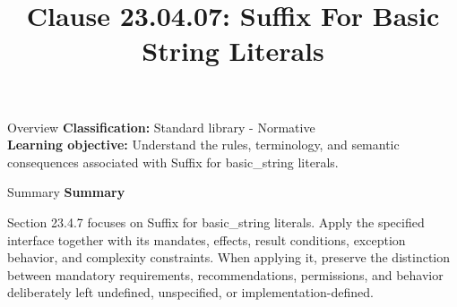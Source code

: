 \documentclass[10pt,letterpaper]{article}
\title{Clause 23.04.07: Suffix For Basic String Literals}
\author{}
\date{}
\begin{document}
\maketitle
\begin{CornellOverviewBox}{Overview}
\textbf{Classification:} Standard library - Normative\\[2pt]
\textbf{Learning objective:} Understand the rules, terminology, and semantic consequences associated with Suffix for basic\_string literals.
\end{CornellOverviewBox}\begin{CornellSummaryBox}{Summary}
{\sffamily\bfseries\color{Accent} Summary}\par\vspace{3pt}Section 23.4.7 focuses on Suffix for basic\_string literals. Apply the specified interface together with its mandates, effects, result conditions, exception behavior, and complexity constraints. When applying it, preserve the distinction between mandatory requirements, recommendations, permissions, and behavior deliberately left undefined, unspecified, or implementation-defined.
\end{CornellSummaryBox}
\end{document}
